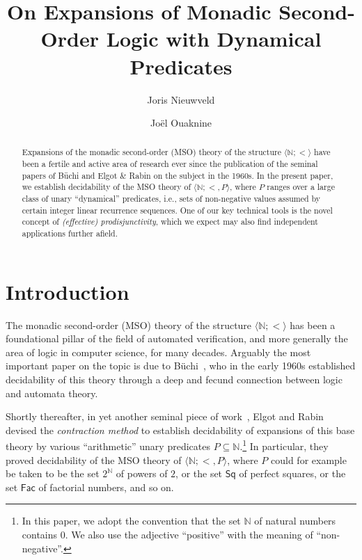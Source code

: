 \documentclass[a4paper,UKenglish,cleveref, autoref, thm-restate]{lipics-v2021}
\title{On Expansions of Monadic Second-Order Logic with Dynamical Predicates} %
\author{Joris {Nieuwveld}}{Max Planck Institute for Software Systems, Saarland Informatics Campus, Germany}{jnieuwve@mpi-sws.org}{https://orcid.org/0009-0002-0339-1230}{}%
\author{Jo\"el Ouaknine}%
   {Max Planck Institute for Software Systems, Saarland Informatics
     Campus, Germany}{joel@mpi-sws.org}{https://orcid.org/0000-0003-0031-9356}{Also affiliated with Keble College, Oxford as
\href{https://www.emmy.network/}{emmy.network} Fellow, and supported by ERC grant DynAMiCs (101167561) and DFG grant
389792660 as part of \href{https://perspicuous-computing.science}{TRR 248}.}
\newcommand{\nat} {\mathbb{N}}
\begin{document}
\maketitle

\begin{abstract}
Expansions of the monadic second-order (MSO) theory of the structure
  $\langle \nat ; < \rangle$ have been a fertile and active area of
  research ever since the publication of the seminal papers of B\"uchi
  and Elgot \& Rabin on the subject in the 1960s. In the present paper, we
  establish decidability of the MSO theory of
  $\langle \nat ; <,P \rangle$, where $P$ ranges over a large class of unary
  ``dynamical'' predicates, i.e., sets of non-negative
  values assumed by certain integer linear recurrence sequences. One
  of our key technical tools is the novel concept of \emph{(effective) prodisjunctivity}, which we expect may also find independent applications
  further afield.
\end{abstract}

\section{Introduction}
\label{sec : intro}

The monadic second-order (MSO) theory of the structure
$\langle \nat ; < \rangle$ has been a foundational pillar of the field
of automated verification, and more generally the area of logic in
computer science, for many decades.
Arguably the most important paper on the topic is due to
B\"uchi~\cite{buchi1966symposium}, who in the early 1960s established
decidability of this theory through a deep and fecund connection between logic
and automata theory.

Shortly thereafter, in yet another seminal piece of
work~\cite{elgot1966decidability}, Elgot and Rabin devised the
\emph{contraction method} to establish decidability of expansions of
this base theory by various ``arithmetic'' unary predicates
$P \subseteq \nat$.\footnote{In this paper, we adopt the convention
  that the set $\nat$ of natural numbers contains $0$. We also use the
  adjective ``positive'' with the meaning of ``non-negative''.}  In
particular, they proved decidability of the MSO theory of
$\langle \nat ; <,P \rangle$, where $P$ could for example be taken to
be the set $2^\nat$ of powers of $2$, or the set $\mathsf{Sq}$ of
perfect squares, or the set $\mathsf{Fac}$ of factorial numbers, and
so on.
\end{document}
